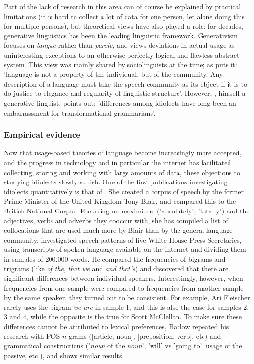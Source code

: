 \documentclass[11pt]{article}
\begin{document}
Part of the lack of research in this area can of course be explained by practical limitations (it is hard to collect a lot of data for one person, let alone doing this for multiple persons), but theoretical views have also played a role: for decades, generative linguistics has been the leading linguistic framework. Generativism focuses on \emph{langue} rather than \emph{parole}, and views deviations in actual usage as uninteresting exceptions to an otherwise perfectly logical and flawless abstract system. This view was mainly shared by sociolinguists at the time; as  puts it: 'language is not a property of the individual, but of the community. Any description of a language must take the speech community as its object if it is to do justice to elegance and regularity of linguistic structure'. However, , himself a generative linguist, points out: 'differences among idiolects have long been an embarrassment for transformational grammarians'.

\subsubsection{Empirical evidence}
Now that usage-based theories of language become increasingly more accepted, and the progress in technology and in particular the internet has facilitated collecting, storing and working with large amounts of data, these objections to studying idiolects slowly vanish. One of the first publications investigating idiolects quantitatively is that of . She created a corpus of speech by the former Prime Minister of the United Kingdom Tony Blair, and compared this to the British National Corpus. Focussing on maximisers ('absolutely', 'totally') and the adjectives, verbs and adverbs they cooccur with, she has compiled a list of collocations that are used much more by Blair than by the general language community.  investigated speech patterns of five White House Press Secretaries, using transcripts of spoken language available on the internet and dividing them in samples of 200.000 words. He compared the frequencies of bigrams and trigrams (like \emph{of the}, \emph{that we} and \emph{and that's}) and discovered that there are significant differences between individual speakers. Interestingly, however, when frequencies from one sample were compared to frequencies from another sample by the same speaker, they turned out to be consistent. For example, Ari Fleischer rarely uses the bigram \emph{we are} in sample 1, and this is also the case for samples 2, 3 and 4, while the opposite is the true for Scott McClellan. To make sure these differences cannot be attributed to lexical preferences, Barlow repeated his research with POS $n$-grams ([article, noun], [preposition, verb], etc) and grammatical constructions ('\emph{noun} of the \emph{noun}',  'will' vs 'going to', usage of the passive, etc.), and shows similar results.
\end{document}

